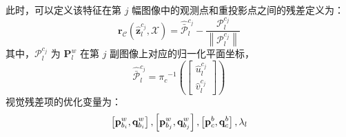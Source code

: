 此时，可以定义该特征在第 $j$ 幅图像中的观测点和重投影点之间的残差定义为：
\begin{equation}
\label{eqn:4.19}
\mathbf{r}_\mathcal{C}(\hat{\mathbf{z}}_l^{c_j},\mathcal{X})= 
\hat{\bar{\mathcal{P}}}_l^{c_j}-\frac{ \mathcal{P}_l^{c_j} }{\left\|\mathcal{P}_l^{c_j}\right\|}
\end{equation}
其中，$\mathcal{P}_l^{c_j} $ 为 $\mathbf{P}_l^{w} $ 在第 $j$ 副图像上对应的归一化平面坐标，
\begin{equation}
\label{eqn:4.20}
\hat{\bar{\mathcal{P}}}_l^{c_j}={\pi_c}^{-1}
(\begin{bmatrix}  \hat{u}_l^{c_j} \\ \hat{v}_l^{c_j}
\end{bmatrix})
\end{equation}
视觉残差项的优化变量为：
\[
\setlength{\abovedisplayskip}{6pt}
\setlength{\belowdisplayskip}{6pt}
\left[ \mathbf{p}_{b_{i}}^{w}, \mathbf{q}_{b_{i}}^{w}\right], 
\left[ \mathbf{p}_{b_{j}}^{w}, \mathbf{q}_{b_{j}}^{w}\right], 
\left[ \mathbf{p}_{c}^{b}, \mathbf{q}_{c}^{b}\right], 
\lambda_{l}
\]

